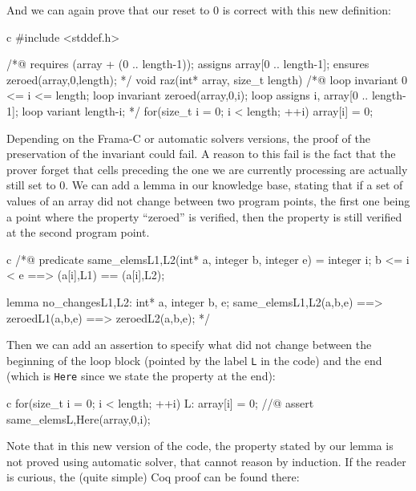 \documentclass[middle]{zmdocument}
\begin{document}
And we can again prove that our reset to 0 is correct with this new
definition:



\begin{CodeBlock}{c}
#include <stddef.h>

/*@
  requires \valid(array + (0 .. length-1));
  assigns  array[0 .. length-1];
  ensures  zeroed(array,0,length);
*/
void raz(int* array, size_t length){
  /*@
    loop invariant 0 <= i <= length;
    loop invariant zeroed(array,0,i);
    loop assigns i, array[0 .. length-1];
    loop variant length-i;
  */
  for(size_t i = 0; i < length; ++i)
    array[i] = 0;
}
\end{CodeBlock}



Depending on the Frama-C or automatic solvers versions, the proof of the
preservation of the invariant could fail. A reason to this fail is the
fact that the prover forget that cells preceding the one we are
currently processing are actually still set to 0. We can add a lemma in
our knowledge base, stating that if a set of values of an array did not
change between two program points, the first one being a point where the
property ``zeroed'' is verified, then the property is still verified at
the second program point.



\begin{CodeBlock}{c}
/*@
  predicate same_elems{L1,L2}(int* a, integer b, integer e) =
    \forall integer i; b <= i < e ==> \at(a[i],L1) == \at(a[i],L2);

  lemma no_changes{L1,L2}:
  \forall int* a, integer b, e;
  same_elems{L1,L2}(a,b,e) ==> zeroed{L1}(a,b,e) ==> zeroed{L2}(a,b,e);
*/
\end{CodeBlock}



Then we can add an assertion to specify what did not change between the
beginning of the loop block (pointed by the label \texttt{L} in the
code) and the end (which is \texttt{Here} since we state the property at
the end):



\begin{CodeBlock}{c}
for(size_t i = 0; i < length; ++i){
  L:
  array[i] = 0;
  //@ assert same_elems{L,Here}(array,0,i);
}
\end{CodeBlock}



Note that in this new version of the code, the property stated by our
lemma is not proved using automatic solver, that cannot reason by
induction. If the reader is curious, the (quite simple) Coq proof can be
found there:
\end{document}
